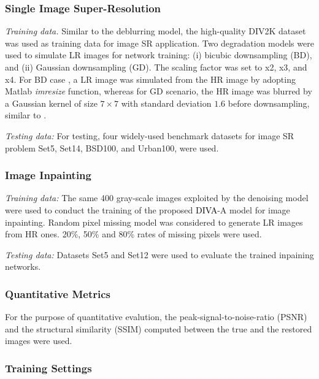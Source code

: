 \documentclass[10pt,journal,compsoc]{IEEEtran}
\newcommand{\dk}{\textcolor{black}}
\begin{document}
\subsubsection{Single Image Super-Resolution}

\textit{Training data.}
Similar to the deblurring model, the high-quality DIV2K \cite{agustsson2017ntire} dataset was used as training data for image SR application.
Two degradation models were used to simulate LR images for network training: (i) bicubic downsampling (BD), and (ii) Gaussian downsampling (GD). The scaling factor was set to x2, x3, and x4. For BD case \cite{Anwar2022densely}, a LR image was simulated from the HR image by adopting Matlab \textit{imresize} function, whereas for GD scenario, the HR image was blurred by a Gaussian kernel of size $7 \times 7$ with standard deviation $1.6$ before downsampling, similar to \cite{Anwar2022densely}.


\textit{Testing data:}
For testing, four widely-used benchmark datasets for image SR problem \cite{Anwar2022densely, Ahn2018fast, Tai2017MemNet} Set5, Set14, BSD100, and Urban100, were used.



\subsubsection{Image Inpainting}
\textit{Training data:}
The same 400 gray-scale images \cite{Zhang2017beyond} exploited by the denoising model were used to conduct the training of the proposed \dk{DIVA}-A model for image inpainting. Random pixel missing model was considered to generate LR images from HR ones. 20\%, 50\% and 80\% rates of missing pixels were used.


\textit{Testing data:}
Datasets Set5 and Set12 were used to evaluate the trained inpaining networks.




\subsubsection{Quantitative Metrics}

For the purpose of quantitative evalution, the peak-signal-to-noise-ratio (PSNR) and the structural similarity (SSIM)
computed between the true and the restored images were used.


\subsubsection{Training Settings}
\end{document}
